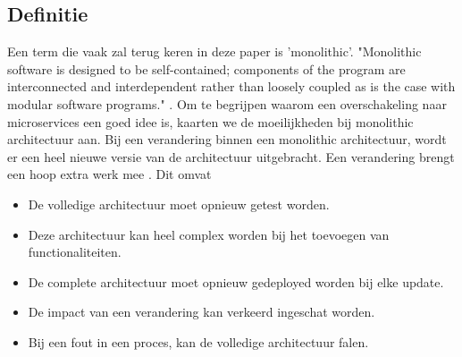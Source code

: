 \subsection{Definitie}
Een term die vaak zal terug keren in deze paper is 'monolithic'. "Monolithic software is designed to be self-contained; components of the program are interconnected and interdependent rather than loosely coupled as is the case with modular software programs." \textcite{Wigmore2016}.
Om te begrijpen waarom een overschakeling naar microservices een goed idee is, kaarten we de moeilijkheden bij monolithic architectuur aan. Bij een verandering binnen een monolithic architectuur, wordt er een heel nieuwe versie van de architectuur uitgebracht. Een verandering brengt een hoop extra werk mee \textcite{Mauersberger2017}. Dit omvat 
\begin{itemize}
	\item De volledige architectuur moet opnieuw getest worden.
	\item Deze architectuur kan heel complex worden bij het toevoegen van functionaliteiten.
	\item De complete architectuur moet opnieuw gedeployed worden bij elke update.
	\item De impact van een verandering kan verkeerd ingeschat worden.
	\item Bij een fout in een proces, kan de volledige architectuur falen.
\end{itemize}
